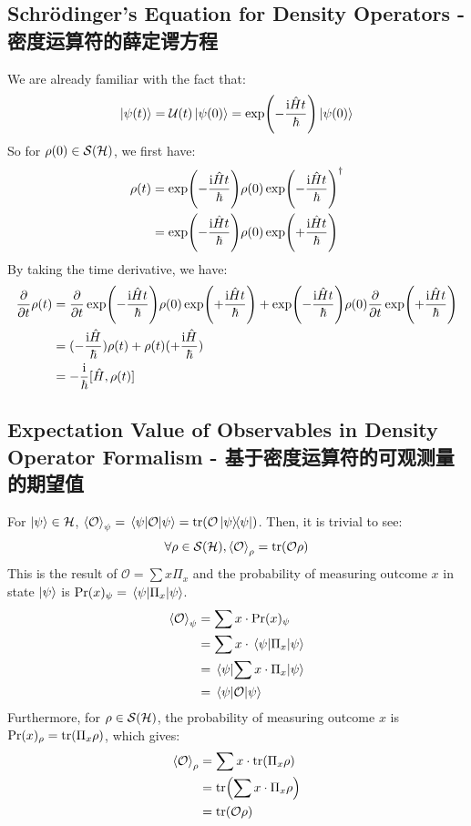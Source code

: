 \subsection{Schr\"odinger's Equation for Density Operators - 密度运算符的薛定谔方程}
We are already familiar with the fact that:
$$\ket{\psi(t)} = \mathcal{U}(t)\ket{\psi(0)} = \exp(-\frac{\mathrm{i} \hat{H} t}{\hbar}) \ket{\psi(0)}$$
So for $\rho(0) \in \mathcal{S}(\mathcal{H})$, we first have:
\begin{align*}
    \rho(t) &= \exp(-\frac{\mathrm{i} \hat{H} t}{\hbar}) \rho(0) \exp(-\frac{\mathrm{i} \hat{H} t}{\hbar})^{\dagger} \\
    &= \exp(-\frac{\mathrm{i} \hat{H} t}{\hbar}) \rho(0) \exp(+\frac{\mathrm{i} \hat{H} t}{\hbar})
\end{align*}
By taking the time derivative, we have:
\begin{align*}
    \pdv{t}\rho(t) &= \pdv{t}\exp(-\frac{\mathrm{i} \hat{H} t}{\hbar}) \rho(0) \exp(+\frac{\mathrm{i} \hat{H} t}{\hbar}) + \exp(-\frac{\mathrm{i} \hat{H} t}{\hbar}) \rho(0) \pdv{t} \exp(+\frac{\mathrm{i} \hat{H} t}{\hbar}) \\
    &= (-\frac{\mathrm{i} \hat{H}}{\hbar})\rho(t) + \rho(t)(+\frac{\mathrm{i} \hat{H}}{\hbar}) \\
    &= -\frac{\mathrm{i}}{\hbar} [\hat{H}, \rho(t)]
\end{align*}

\subsection{Expectation Value of Observables in Density Operator Formalism - 基于密度运算符的可观测量的期望值}
For $\ket{\psi} \in \mathcal{H}$, $\expval{\mathcal{O}}_\psi = \ev{\mathcal{O}}{\psi} = \tr(\mathcal{O}\dyad{\psi})$. Then, it is trivial to see:
$$\forall \rho \in \mathcal{S}(\mathcal{H}), \expval{\mathcal{O}}_\rho = \tr(\mathcal{O}\rho)$$
This is the result of $\mathcal{O} = \sum x \Pi_x$ and the probability of measuring outcome $x$ in state $\ket{\psi}$ is $\Prob{x}_\psi = \ev{\Pi_x}{\psi}$.
\begin{align*}
    \expval{\mathcal{O}}_\psi &= \sum x \cdot \Prob{x}_\psi \\
    &= \sum x \cdot \ev{\Pi_x}{\psi} \\
    &= \ev{\sum x \cdot \Pi_x}{\psi} \\
    &= \ev{\mathcal{O}}{\psi}
\end{align*}
Furthermore, for $\rho \in \mathcal{S}(\mathcal{H})$, the probability of measuring outcome $x$ is $\text{Pr}(x)_\rho = \tr(\Pi_x \rho)$, which gives:
\begin{align*}
    \expval{\mathcal{O}}_\rho &= \sum x \cdot \tr(\Pi_x \rho) \\
    &= \tr(\sum x \cdot \Pi_x \rho) \\
    &= \tr(\mathcal{O}\rho)
\end{align*}

\newpage
